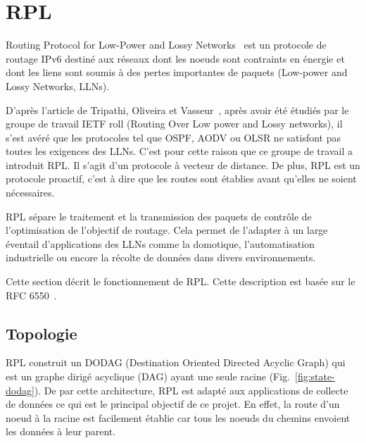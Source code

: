 \section{RPL}\label{sec:state-rpl}
\renewcommand{\rightmark}{RPL}

Routing Protocol for Low-Power and Lossy Networks~\cite{rfc:rpl} est un protocole de routage IPv6 destiné aux réseaux dont les noeuds sont contraints en énergie et dont les liens sont soumis à des pertes importantes de paquets (Low-power and Lossy Networks, LLNs).

D'après l'article de Tripathi, Oliveira et Vasseur~\cite{paper:rpl-study}, après avoir été étudiés par le groupe de travail IETF roll (Routing Over Low power and Lossy networks), il s'est avéré que les protocoles tel que OSPF, AODV ou OLSR ne satisfont pas toutes les exigences des LLNs. C'est pour cette raison que ce groupe de travail a introduit RPL.
Il s'agit d'un protocole à vecteur de distance. De plus, RPL est un protocole proactif, c'est à dire que les routes sont établies avant qu'elles ne soient nécessaires.

RPL sépare le traitement et la transmission des paquets de contrôle de l'optimisation de l'objectif de routage. Cela permet de l'adapter à un large éventail d'applications des LLNs comme la domotique, l'automatisation industrielle ou encore la récolte de données dans divers environnements.


Cette section décrit le fonctionnement de RPL. Cette description est basée sur le RFC 6550~\cite{rfc:rpl}.


\subsection*{Topologie}
    RPL construit un DODAG (Destination Oriented Directed Acyclic Graph) qui est un graphe dirigé 
    acyclique (DAG) ayant une seule racine (Fig.~\ref{fig:state-dodag}). De par cette architecture, 
    RPL est adapté aux applications de collecte de données ce qui est le principal objectif de ce 
    projet. En effet, la route d'un noeud à la racine est facilement établie car tous les noeuds du 
    chemins envoient les données à leur parent.

